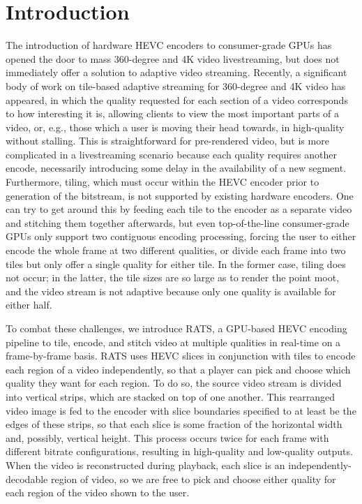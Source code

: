 
\section{Introduction}
The introduction of hardware HEVC encoders to consumer-grade GPUs has opened the door to mass 360-degree and 4K video livestreaming, but does not immediately offer a solution to adaptive video streaming. Recently, a significant body of work on tile-based adaptive streaming for 360-degree and 4K video has appeared, in which the quality requested for each section of a video corresponds to how interesting it is, allowing clients to view the most important parts of a video, or, e.g., those which a user is moving their head towards, in high-quality without stalling. This is straightforward for pre-rendered video, but is more complicated in a livestreaming scenario because each quality requires another encode, necessarily introducing some delay in the availability of a new segment. Furthermore, tiling, which must occur within the HEVC encoder prior to generation of the bitstream, is not supported by existing hardware encoders. One can try to get around this by feeding each tile to the encoder as a separate video and stitching them together afterwards, but even top-of-the-line consumer-grade GPUs only support two contiguous encoding processing, forcing the user to either encode the whole frame at two different qualities, or divide each frame into two tiles but only offer a single quality for either tile. In the former case, tiling does not occur; in the latter, the tile sizes are so large as to render the point moot, and the video stream is not adaptive because only one quality is available for either half.

To combat these challenges, we introduce RATS, a GPU-based HEVC encoding pipeline to tile, encode, and stitch video at multiple qualities in real-time on a frame-by-frame basis. RATS uses HEVC slices in conjunction with tiles to encode each region of a video independently, so that a player can pick and choose which quality they want for each region. To do so, the source video stream is divided into vertical strips, which are stacked on top of one another. This rearranged video image is fed to the encoder with slice boundaries specified to at least be the edges of these strips, so that each slice is some fraction of the horizontal width and, possibly, vertical height. This process occurs twice for each frame with different bitrate configurations, resulting in high-quality and low-quality outputs. When the video is reconstructed during playback, each slice is an independently-decodable region of video, so we are free to pick and choose either quality for each region of the video shown to the user.

